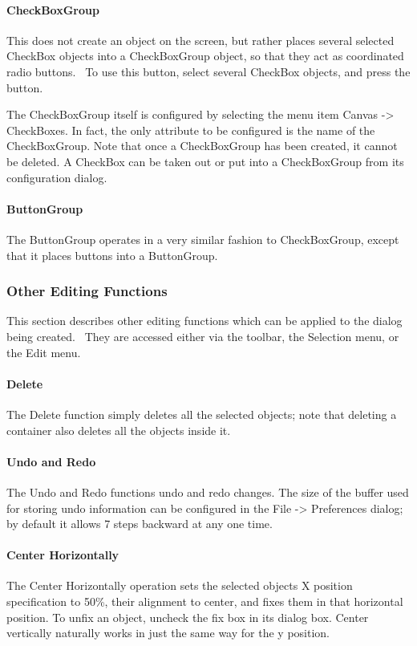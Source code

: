\paragraph{CheckBoxGroup}
This does not create an object on the screen, but rather
places several selected \textsf{CheckBox} objects into a
\textsf{CheckBoxGroup} object, so that they act as coordinated radio
buttons. \ To use this button, select several \textsf{CheckBox}
objects, and press the button.

The \textsf{CheckBoxGroup} itself is configured by selecting the menu
item Canvas -{\textgreater} CheckBoxes. In fact, the only attribute to
be configured is the name of the \textsf{CheckBoxGroup}. Note that once
a \textsf{CheckBoxGroup} has been created, it cannot be deleted. A
\textsf{CheckBox} can be taken out or put into a \textsf{CheckBoxGroup}
from its configuration dialog.

\paragraph{ButtonGroup}
The \textsf{ButtonGroup} operates in a very similar fashion to
\textsf{CheckBoxGroup}, except that it places buttons into a
\textsf{ButtonGroup}.

\subsubsection{Other Editing Functions}
This section describes other editing functions which can be applied to
the dialog being created. \ They are accessed either via the toolbar,
the Selection menu, or the Edit menu.

\paragraph{Delete}
The Delete function simply deletes all the selected objects; note that
deleting a container also deletes all the objects inside it.

\paragraph{Undo and Redo}
The Undo and Redo functions undo and redo changes. The size of the
buffer used for storing undo information can be configured in the File
-{\textgreater} Preferences dialog; by default it allows 7 steps
backward at any one time.

\paragraph[Center Horizontally]{Center Horizontally}
The Center Horizontally operation sets the selected
objects{\textquotesingle} X position specification to
{\textquotedbl}50\%{\textquotedbl}, their alignment to center, and
fixes them in that horizontal position. To
{\textquotedbl}unfix{\textquotedbl} an object, uncheck the
{\textquotedbl}fix{\textquotedbl} box in its dialog box. Center
vertically naturally works in just the same way for the y position.

